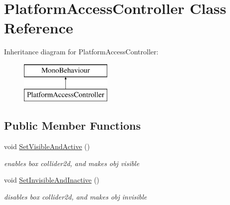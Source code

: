 \hypertarget{class_platform_access_controller}{}\section{Platform\+Access\+Controller Class Reference}
\label{class_platform_access_controller}
Inheritance diagram for Platform\+Access\+Controller\+:\begin{figure}[H]
\begin{center}
\leavevmode
\includegraphics[height=2.000000cm]{class_platform_access_controller}
\end{center}
\end{figure}
\subsection*{Public Member Functions}
\begin{DoxyCompactItemize}
\item 
void \hyperlink{class_platform_access_controller_a3999dc4cf501e3092bf06662e215afaf}{Set\+Visible\+And\+Active} ()
\begin{DoxyCompactList}\small\item\em enables box collider2d, and makes obj visible \end{DoxyCompactList}\item 
void \hyperlink{class_platform_access_controller_adae7a500e267262f6262b9997fb7e9d4}{Set\+Invisible\+And\+Inactive} ()
\begin{DoxyCompactList}\small\item\em disables box collider2d, and makes obj invisible \end{DoxyCompactList}\end{DoxyCompactItemize}
